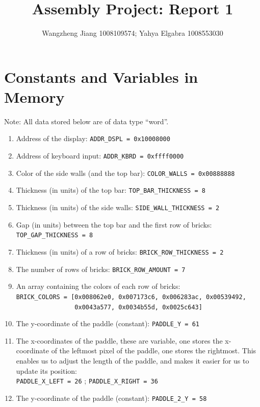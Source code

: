 \documentclass[11pt]{article}
\title{Assembly Project: Report 1}
\author{Wangzheng Jiang 1008109574; Yahya Elgabra 1008553030}
\begin{document}
\maketitle

\section{Constants and Variables in Memory}

Note: All data stored below are of data type ``word''.
\begin{enumerate}

\item Address of the display: \verb+ADDR_DSPL = 0x10008000+
\item Address of keyboard input: \verb+ADDR_KBRD = 0xffff0000+
\\
\item Color of the side walls (and the top bar): \verb+COLOR_WALLS = 0x00888888+
\item Thickness (in units) of the top bar: \verb+TOP_BAR_THICKNESS = 8+
\item Thickness (in units) of the side walls: \verb+SIDE_WALL_THICKNESS = 2+
\item Gap (in units) between the top bar and the first row of bricks: \verb+TOP_GAP_THICKNESS = 8+
\\
\item Thickness (in units) of a row of bricks: \verb+BRICK_ROW_THICKNESS = 2+
\item The number of rows of bricks: \verb+BRICK_ROW_AMOUNT = 7+
\item An array containing the colors of each row of bricks: \\ \verb+BRICK_COLORS = [0x008062e0, 0x007173c6, 0x006283ac, 0x00539492,+\\ \verb+                0x0043a577, 0x0034b55d, 0x0025c643]+
\\
\item The y-coordinate of the paddle (constant): \verb+PADDLE_Y = 61+
\item The x-coordinates of the paddle, these are variable, one stores the x-coordinate of the leftmost pixel of the paddle, one stores the rightmost. This enables us to adjust the length of the paddle, and makes it easier for us to update its position:\\ \verb+PADDLE_X_LEFT = 26+ ; \verb+PADDLE_X_RIGHT = 36+
\\
\item The y-coordinate of the paddle (constant): \verb+PADDLE_2_Y = 58+

\end{enumerate}
\end{document}
